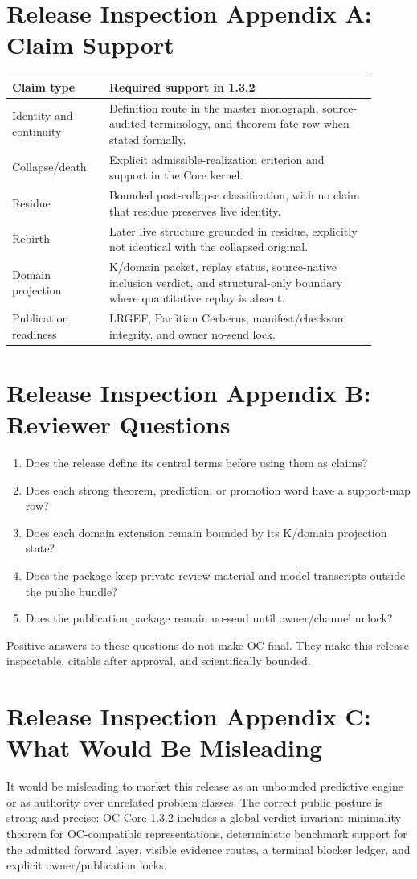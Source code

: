 \documentclass[11pt,a4paper]{article}
\begin{document}
\section*{Release Inspection Appendix A: Claim Support}
\begin{longtable}{>{\raggedright\arraybackslash}p{0.24\linewidth}>{\raggedright\arraybackslash}p{0.66\linewidth}}
\textbf{Claim type} & \textbf{Required support in 1.3.2}\\
\hline
Identity and continuity & Definition route in the master monograph, source-audited terminology, and theorem-fate row when stated formally.\\
Collapse/death & Explicit admissible-realization criterion and support in the Core kernel.\\
Residue & Bounded post-collapse classification, with no claim that residue preserves live identity.\\
Rebirth & Later live structure grounded in residue, explicitly not identical with the collapsed original.\\
Domain projection & K/domain packet, replay status, source-native inclusion verdict, and structural-only boundary where quantitative replay is absent.\\
Publication readiness & LRGEF, Parfitian Cerberus, manifest/checksum integrity, and owner no-send lock.\\
\end{longtable}

\clearpage
\section*{Release Inspection Appendix B: Reviewer Questions}
\begin{enumerate}
  \item Does the release define its central terms before using them as claims?
  \item Does each strong theorem, prediction, or promotion word have a support-map row?
  \item Does each domain extension remain bounded by its K/domain projection state?
  \item Does the package keep private review material and model transcripts outside the public bundle?
  \item Does the publication package remain no-send until owner/channel unlock?
\end{enumerate}
Positive answers to these questions do not make OC final. They make this release inspectable, citable after approval, and scientifically bounded.

\clearpage
\section*{Release Inspection Appendix C: What Would Be Misleading}
It would be misleading to market this release as an unbounded predictive engine or as authority over unrelated problem classes. The correct public posture is strong and precise: OC Core 1.3.2 includes a global verdict-invariant minimality theorem for OC-compatible representations, deterministic benchmark support for the admitted forward layer, visible evidence routes, a terminal blocker ledger, and explicit owner/publication locks.
\end{document}
